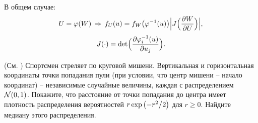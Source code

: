 \begin{ordre}
В общем случае: 
$$
U=\varphi(W) \,\Rightarrow\, f_U(u)=f_W\bigl(\varphi^{-1}(u)\bigr) \Bigl| J\Bigl( \frac{\partial W}{\partial U}\Bigr)\Bigr|,$$
$$
J(\cdot)=\det\Bigl( \frac{\partial \varphi_i^{-1}(u)}{\partial u_j}\Bigr) . 
$$
\end{ordre}


\begin{problem}(См. \cite{4})
Спортсмен стреляет по круговой мишени. Вертикальная и горизонтальная 
координаты точки попадания пули (при условии, что центр мишени -- начало 
координат) -- независимые случайные величины, каждая с распределением 
$\mathcal{N}(0,1)$. Покажите, что расстояние от точки попадания до центра имеет 
плотность распределения вероятностей $r\exp \left( {-{r^2} \mathord{\left/ 
{\vphantom {{r^2} 2}} \right. \kern-\nulldelimiterspace} 2} \right)$ для 
$r\ge 0$. Найдите медиану этого распределения.
\end{problem}